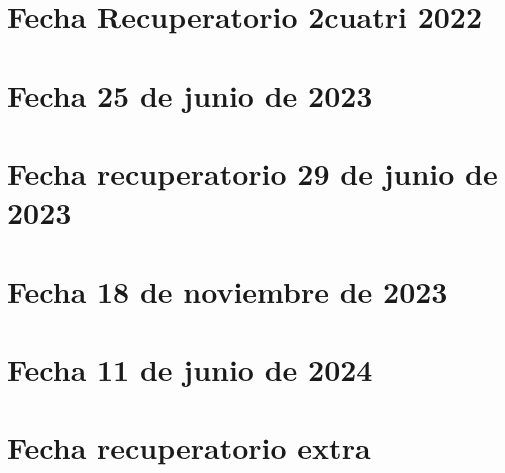 \documentclass{report}
\begin{document}
        \section{Fecha Recuperatorio 2cuatri 2022}
            



        \newpage
        \section{Fecha 25 de junio de 2023}
            



        \newpage
        \section{Fecha recuperatorio 29 de junio de 2023}
            



        \newpage
        \section{Fecha 18 de noviembre de 2023}
            



        \newpage
        \section{Fecha 11 de junio de 2024}
            
     
    
          
           
            
          
                  \newpage
        \section{Fecha recuperatorio extra}
            
\end{document}
